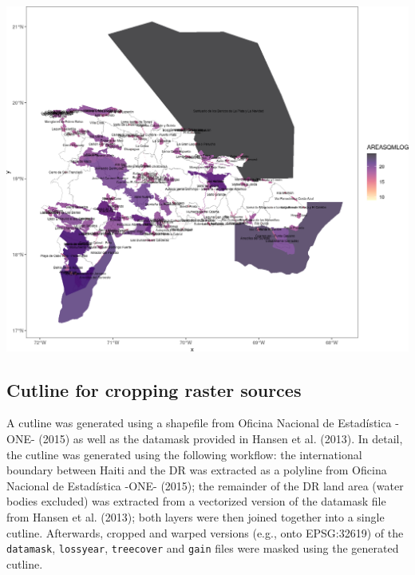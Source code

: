 \documentclass[10pt,landscape,a3paper]{article}
\begin{document}
\begin{center}\includegraphics{img/data-download-preparation-eda/protected-areas-1} \end{center}

\hypertarget{cutline-for-cropping-raster-sources}{%
\subsection{Cutline for cropping raster
sources}\label{cutline-for-cropping-raster-sources}}

A cutline was generated using a shapefile from Oficina Nacional de
Estadística -ONE- (2015) as well as the datamask provided in Hansen et
al. (2013). In detail, the cutline was generated using the following
workflow: the international boundary between Haiti and the DR was
extracted as a polyline from Oficina Nacional de Estadística -ONE-
(2015); the remainder of the DR land area (water bodies excluded) was
extracted from a vectorized version of the datamask file from Hansen et
al. (2013); both layers were then joined together into a single cutline.
Afterwards, cropped and warped versions (e.g., onto EPSG:32619) of the
\texttt{datamask}, \texttt{lossyear}, \texttt{treecover} and
\texttt{gain} files were masked using the generated cutline.
\end{document}

